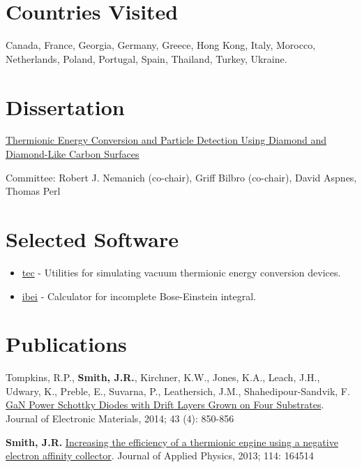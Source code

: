 \section{Countries Visited}\label{countries-visited}

Canada, France, Georgia, Germany, Greece, Hong Kong, Italy, Morocco,
Netherlands, Poland, Portugal, Spain, Thailand, Turkey, Ukraine.

\section{Dissertation}\label{dissertation}

\href{http://www.lib.ncsu.edu/resolver/1840.16/3107}{Thermionic Energy
Conversion and Particle Detection Using Diamond and Diamond-Like Carbon
Surfaces}

Committee: Robert J. Nemanich (co-chair), Griff Bilbro (co-chair), David
Aspnes, Thomas Perl

\section{Selected Software}\label{selected-software}

\begin{itemize}
\tightlist
\item
  \href{http://jrsmith3.github.io/tec/}{tec} - Utilities for simulating
  vacuum thermionic energy conversion devices.
\item
  \href{http://ibei.readthedocs.org/en/latest/}{ibei} - Calculator for
  incomplete Bose-Einstein integral.
\end{itemize}

\section{Publications}\label{publications}

Tompkins, R.P., \textbf{Smith, J.R.}, Kirchner, K.W., Jones, K.A.,
Leach, J.H., Udwary, K., Preble, E., Suvarna, P., Leathersich, J.M.,
Shahedipour-Sandvik, F.
\href{http://dx.doi.org/10.1007/s11664-014-3021-9}{GaN Power Schottky
Diodes with Drift Layers Grown on Four Substrates}. Journal of
Electronic Materials, 2014; 43 (4): 850-856

\textbf{Smith, J.R.}
\href{http://dx.doi.org/10.1063/1.4826202}{Increasing the efficiency of
a thermionic engine using a negative electron affinity collector}.
Journal of Applied Physics, 2013; 114: 164514

